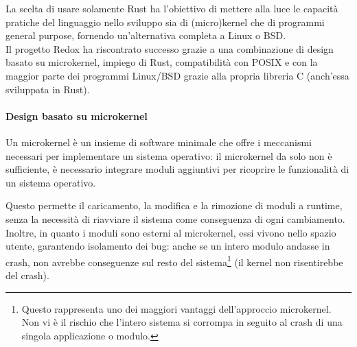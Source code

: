 La scelta di usare solamente Rust ha l'obiettivo di mettere alla luce le capacità pratiche del linguaggio 
nello sviluppo sia di (micro)kernel che di programmi general purpose, fornendo un'alternativa completa a Linux o BSD.\hfill
\vspace{7pt} \\
\noindent Il progetto Redox ha riscontrato successo grazie a una combinazione di design basato su microkernel,
impiego di Rust, compatibilità con POSIX e con la maggior parte dei programmi Linux/BSD grazie alla propria libreria C (anch'essa sviluppata in Rust).

\paragraph{Design basato su microkernel}
Un microkernel è un insieme di software minimale che offre i meccanismi necessari per implementare un sistema operativo: il microkernel da solo
non è sufficiente, è necessario integrare moduli aggiuntivi per ricoprire le funzionalità di un sistema operativo.\ 

Questo permette il caricamento, la modifica e la rimozione di moduli a runtime, senza la necessità di riavviare il sistema come conseguenza di ogni cambiamento.
Inoltre, in quanto i moduli sono esterni al microkernel, essi vivono nello spazio utente, garantendo isolamento dei bug: anche se un intero modulo
andasse in crash, non avrebbe conseguenze sul resto del sistema\footnote{Questo rappresenta uno dei maggiori vantaggi dell'approccio microkernel. Non vi è il rischio che l'intero sistema si corrompa in seguito al crash di una singola applicazione o modulo.} (il kernel non risentirebbe del crash).

